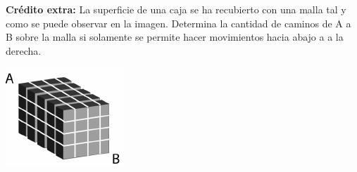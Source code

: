 \textbf{Crédito extra:}  La superficie de una caja se ha recubierto con una malla tal y como se puede observar en la imagen. Determina la cantidad de caminos de A a B sobre la malla si solamente se permite hacer movimientos hacia abajo a a la derecha.
\vspace{0.5cm}
\begin{center}
    \includegraphics[scale=1]{Imagenes/IMG4/c9.PNG}
\end{center}
